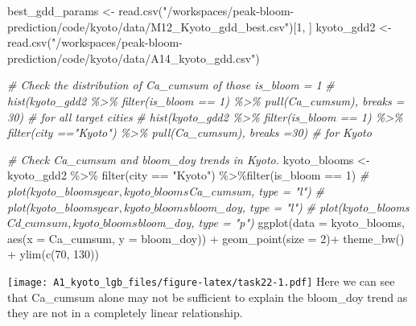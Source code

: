 \documentclass[
]{article}
\newenvironment{Shaded}{\begin{snugshade}}{\end{snugshade}}
\newcommand{\AttributeTok}[1]{\textcolor[rgb]{0.77,0.63,0.00}{#1}}
\newcommand{\CommentTok}[1]{\textcolor[rgb]{0.56,0.35,0.01}{\textit{#1}}}
\newcommand{\DecValTok}[1]{\textcolor[rgb]{0.00,0.00,0.81}{#1}}
\newcommand{\FunctionTok}[1]{\textcolor[rgb]{0.00,0.00,0.00}{#1}}
\newcommand{\NormalTok}[1]{#1}
\newcommand{\OtherTok}[1]{\textcolor[rgb]{0.56,0.35,0.01}{#1}}
\newcommand{\SpecialCharTok}[1]{\textcolor[rgb]{0.00,0.00,0.00}{#1}}
\newcommand{\StringTok}[1]{\textcolor[rgb]{0.31,0.60,0.02}{#1}}
\begin{document}
\begin{Shaded}
\begin{Highlighting}[]
\NormalTok{best\_gdd\_params }\OtherTok{\textless{}{-}} \FunctionTok{read.csv}\NormalTok{(}\StringTok{"/workspaces/peak{-}bloom{-}prediction/code/kyoto/data/M12\_Kyoto\_gdd\_best.csv"}\NormalTok{)[}\DecValTok{1}\NormalTok{, ]}
\NormalTok{kyoto\_gdd2 }\OtherTok{\textless{}{-}} \FunctionTok{read.csv}\NormalTok{(}\StringTok{"/workspaces/peak{-}bloom{-}prediction/code/kyoto/data/A14\_kyoto\_gdd.csv"}\NormalTok{)}

\CommentTok{\# Check the distribution of Ca\_cumsum of those is\_bloom = 1}
\CommentTok{\# hist(kyoto\_gdd2 \%\textgreater{}\% filter(is\_bloom == 1) \%\textgreater{}\% pull(Ca\_cumsum), breaks = 30)  \# for all target cities}
\CommentTok{\# hist(kyoto\_gdd2 \%\textgreater{}\% filter(is\_bloom == 1) \%\textgreater{}\% filter(city =="Kyoto") \%\textgreater{}\% pull(Ca\_cumsum), breaks =30) \# for Kyoto}

\CommentTok{\# Check Ca\_cumsum and bloom\_doy trends in Kyoto.}
\NormalTok{kyoto\_blooms }\OtherTok{\textless{}{-}}\NormalTok{ kyoto\_gdd2 }\SpecialCharTok{\%\textgreater{}\%} \FunctionTok{filter}\NormalTok{(city }\SpecialCharTok{==} \StringTok{"Kyoto"}\NormalTok{) }\SpecialCharTok{\%\textgreater{}\%}\FunctionTok{filter}\NormalTok{(is\_bloom }\SpecialCharTok{==} \DecValTok{1}\NormalTok{)}
\CommentTok{\# plot(kyoto\_blooms$year, kyoto\_blooms$Ca\_cumsum, type = "l")}
\CommentTok{\# plot(kyoto\_blooms$year, kyoto\_blooms$bloom\_doy, type = "l")}
\CommentTok{\# plot(kyoto\_blooms$Cd\_cumsum, kyoto\_blooms$bloom\_doy, type = "p")}
\FunctionTok{ggplot}\NormalTok{(}\AttributeTok{data =}\NormalTok{ kyoto\_blooms, }\FunctionTok{aes}\NormalTok{(}\AttributeTok{x =}\NormalTok{ Ca\_cumsum, }\AttributeTok{y =}\NormalTok{ bloom\_doy)) }\SpecialCharTok{+}
    \FunctionTok{geom\_point}\NormalTok{(}\AttributeTok{size =} \DecValTok{2}\NormalTok{)}\SpecialCharTok{+}
    \FunctionTok{theme\_bw}\NormalTok{() }\SpecialCharTok{+} 
    \FunctionTok{ylim}\NormalTok{(}\FunctionTok{c}\NormalTok{(}\DecValTok{70}\NormalTok{, }\DecValTok{130}\NormalTok{))}
\end{Highlighting}
\end{Shaded}

\texttt{[image: A1\_kyoto\_lgb\_files/figure-latex/task22-1.pdf]} Here we
can see that Ca\_cumsum alone may not be sufficient to explain the
bloom\_doy trend as they are not in a completely linear relationship.

\newpage
\end{document}
